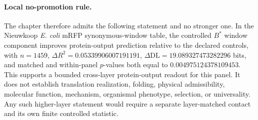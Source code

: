 \paragraph{Local no-promotion rule.}
The chapter therefore admits the following statement and no stronger one.  In the Nieuwkoop \textit{E. coli} mRFP synonymous-window table, the controlled $B^\ast$ window component improves protein-output prediction relative to the declared controls, with $n=1459$, $\Delta R^2=0.05339906007191191$, $\Delta \mathrm{DL}=19.089327473282296$ bits, and matched and within-panel $p$-values both equal to $0.004975124378109453$.  This supports a bounded cross-layer protein-output readout for this panel.  It does not establish translation realization, folding, physical admissibility, molecular function, mechanism, organismal phenotype, selection, or universality.  Any such higher-layer statement would require a separate layer-matched contact and its own finite controlled statistic.